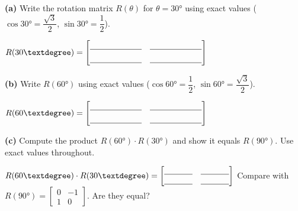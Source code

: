 \documentclass[10pt]{article}
\begin{document}
\vspace{0.1in}

\begin{tcolorbox}[colback=white, colframe=black!40,
    title=\textbf{Tier A --- The Rotation Matrix and Composition},
    fonttitle=\bfseries, arc=2mm, left=3mm, right=3mm, top=2mm, bottom=2mm]
\small

\textbf{(a)} Write the rotation matrix $R(\theta)$ for $\theta = 30°$
using exact values ($\cos30°=\dfrac{\sqrt{3}}{2}$, $\sin30°=\dfrac{1}{2}$).

\vspace{0.06in}
\hspace{1em}
$R(30°) = \begin{bmatrix}\blank{2.2cm}&\blank{2.2cm}\\[4pt]\blank{2.2cm}&\blank{2.2cm}\end{bmatrix}$

\vspace{0.12in}
\textbf{(b)} Write $R(60°)$ using exact values ($\cos60°=\dfrac{1}{2}$, $\sin60°=\dfrac{\sqrt{3}}{2}$).

\vspace{0.06in}
\hspace{1em}
$R(60°) = \begin{bmatrix}\blank{2.2cm}&\blank{2.2cm}\\[4pt]\blank{2.2cm}&\blank{2.2cm}\end{bmatrix}$

\vspace{0.12in}
\textbf{(c)} Compute the product $R(60°)\cdot R(30°)$ and show it equals $R(90°)$.
Use exact values throughout.


\vspace{0.06in}
$R(60°)\cdot R(30°) = \begin{bmatrix}\blank{1.2cm}&\blank{1.2cm}\\\blank{1.2cm}&\blank{1.2cm}\end{bmatrix}$
\qquad Compare with $R(90°) = \begin{bmatrix}0&-1\\1&0\end{bmatrix}$. Are they equal? \blank{1.5cm}

\end{tcolorbox}

\vspace{0.1in}
\end{document}
